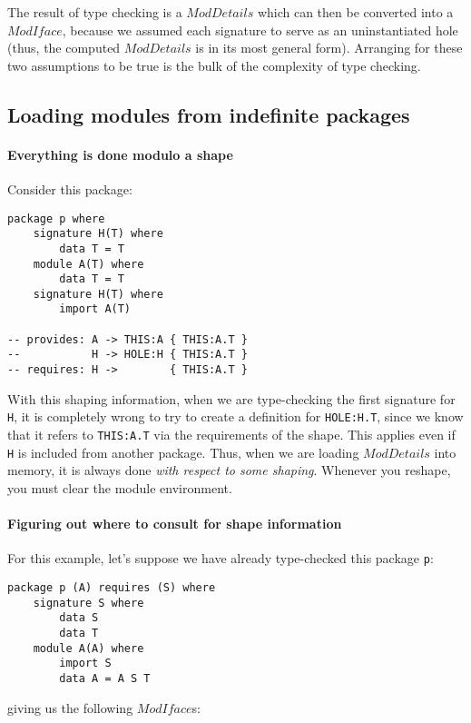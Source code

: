 \documentclass{article}
\newcommand{\I}[1]{\ensuremath{\mathit{#1}}}
\begin{document}
The result of type checking is a \I{ModDetails} which can then be
converted into a \I{ModIface}, because we assumed each signature
to serve as an uninstantiated hole (thus, the computed \I{ModDetails} is
in its most general form).
Arranging for these two assumptions to be true is the bulk of the
complexity of type checking.

\subsection{Loading modules from indefinite packages}

\paragraph{Everything is done modulo a shape}  Consider
this package:

\begin{verbatim}
package p where
    signature H(T) where
        data T = T
    module A(T) where
        data T = T
    signature H(T) where
        import A(T)

-- provides: A -> THIS:A { THIS:A.T }
--           H -> HOLE:H { THIS:A.T }
-- requires: H ->        { THIS:A.T }
\end{verbatim}

With this shaping information, when we are type-checking the first
signature for \verb|H|, it is completely wrong to try to create
a definition for \verb|HOLE:H.T|, since we know that it refers
to \verb|THIS:A.T| via the requirements of the shape.  This applies
even if \verb|H| is included from another package.  Thus, when
we are loading \I{ModDetails} into memory, it is always done
\emph{with respect to some shaping}.  Whenever you reshape,
you must clear the module environment.

\paragraph{Figuring out where to consult for shape information}

For this example, let's suppose we have already type-checked
this package \verb|p|:

\begin{verbatim}
package p (A) requires (S) where
    signature S where
        data S
        data T
    module A(A) where
        import S
        data A = A S T
\end{verbatim}

giving us the following \I{ModIface}s:
\end{document}
